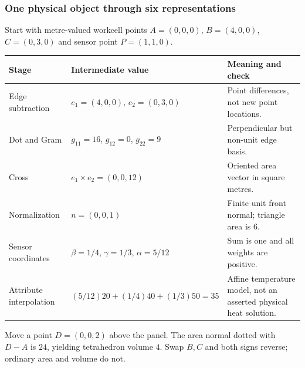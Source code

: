 \subsubsection{One physical object through six representations}\label{appendix-92ff77d4dfdc-one-physical-object-through-six-representations}

\hypertarget{appendix-92ff77d4dfdc-one-physical-object-through-six-representations}{}

Start with metre-valued workcell points \(A=(0,0,0)\), \(B=(4,0,0)\), \(C=(0,3,0)\) and sensor point \(P=(1,1,0)\).

{\def\LTcaptype{none} %
\begin{longtable}[]{@{}
  >{\raggedright\arraybackslash}p{}
  >{\raggedright\arraybackslash}p{}
  >{\raggedright\arraybackslash}p{}@{}}
\toprule\noalign{}
\begin{minipage}[b]{\linewidth}\raggedright
Stage
\end{minipage} & \begin{minipage}[b]{\linewidth}\raggedright
Intermediate value
\end{minipage} & \begin{minipage}[b]{\linewidth}\raggedright
Meaning and check
\end{minipage} \\
\midrule\noalign{}
\endhead
\bottomrule\noalign{}
\endlastfoot
Edge subtraction & \(e_1=(4,0,0)\), \(e_2=(0,3,0)\) & Point differences, not new point locations. \\
Dot and Gram & \(g_{11}=16\), \(g_{12}=0\), \(g_{22}=9\) & Perpendicular but non-unit edge basis. \\
Cross & \(e_1\times e_2=(0,0,12)\) & Oriented area vector in square metres. \\
Normalization & \(n=(0,0,1)\) & Finite unit front normal; triangle area is \(6\). \\
Sensor coordinates & \(\beta=1/4\), \(\gamma=1/3\), \(\alpha=5/12\) & Sum is one and all weights are positive. \\
Attribute interpolation & \((5/12)20+(1/4)40+(1/3)50=35\) & Affine temperature model, not an asserted physical heat solution. \\
\end{longtable}
}

Move a point \(D=(0,0,2)\) above the panel. The area normal dotted with \(D-A\) is \(24\), yielding tetrahedron volume \(4\). Swap \(B,C\) and both signs reverse; ordinary area and volume do not.

